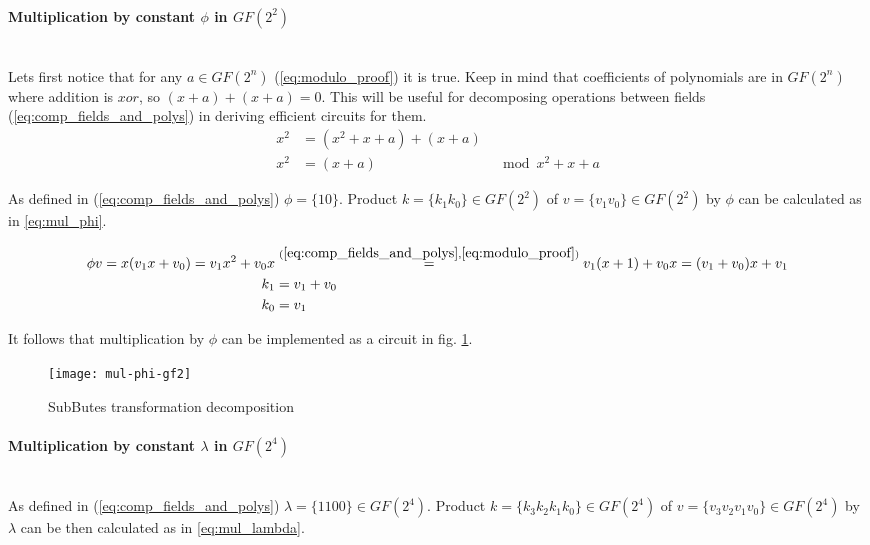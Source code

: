 \paragraph{Multiplication by constant $\phi$ in $GF(2^2)$}\mbox{}\\
Lets first notice that for any $a \in GF(2^n)$ (\ref{eq:modulo_proof}) it is true. Keep in mind that coefficients of polynomials are in $GF(2^n)$ where addition is $xor$, so $(x + a) + (x + a) = 0$. This will be useful for decomposing operations between fields (\ref{eq:comp_fields_and_polys}) in deriving efficient circuits for them.
\begin{equation}
\label{eq:modulo_proof}
\begin{aligned}
x^2 &= (x^2 + x + a) + (x + a) &\\
x^2 &= (x + a)                 &\mod  x^2 + x + a
\end{aligned}
\end{equation}

As defined in (\ref{eq:comp_fields_and_polys}) \cite{vlsi} $\phi = \{10\}$. Product $k = \{k_1k_0\} \in GF(2^2)$ of $v = \{v_1v_0\} \in GF(2^2)$ by $\phi$ can be calculated as in \ref{eq:mul_phi}.

\begin{equation}
\label{eq:mul_phi}
\begin{aligned}
\phi v = x (v_1x + v_0) = v_1x^2 + v_0x &\stackrel{(\ref{eq:comp_fields_and_polys}, \ref{eq:modulo_proof})}{=} v_1(x + 1) + v_0x = (v_1 + v_0)x + v_1\\
k_1 &= v_1 + v_0\\
k_0 &= v_1
\end{aligned}
\end{equation}

It follows that multiplication by $\phi$ can be implemented as a circuit in fig. \ref{fig:phi_mul}.

\begin{figure}[!h]
\label{fig:phi_mul}
\centering
\texttt{[image: mul-phi-gf2]}
\caption{SubButes transformation decomposition}
\end{figure}


\paragraph{Multiplication by constant $\lambda$ in $GF(2^4)$}\mbox{}\\
As defined in (\ref{eq:comp_fields_and_polys}) \cite{vlsi} $\lambda = \{1100\} \in GF(2^4)$. Product $k = \{k_3k_2k_1k_0\} \in GF(2^4)$ of $v = \{v_3v_2v_1v_0\} \in GF(2^4)$ by $\lambda$ can be then calculated as in \ref{eq:mul_lambda}.

